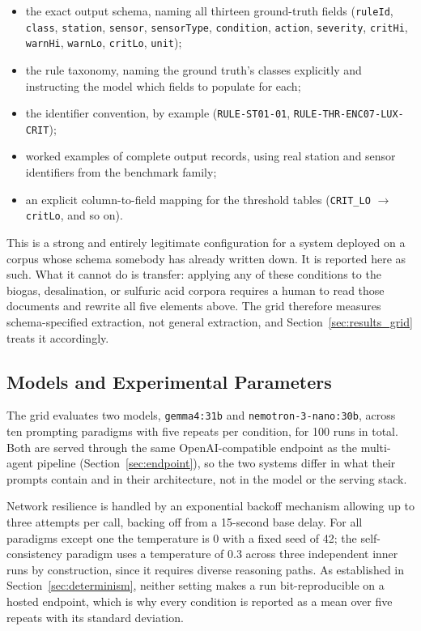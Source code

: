 \documentclass[11pt]{article}
\begin{document}
\begin{itemize}
    \item the exact output schema, naming all thirteen ground-truth fields
          (\texttt{ruleId}, \texttt{class}, \texttt{station}, \texttt{sensor},
          \texttt{sensorType}, \texttt{condition}, \texttt{action},
          \texttt{severity}, \texttt{critHi}, \texttt{warnHi}, \texttt{warnLo},
          \texttt{critLo}, \texttt{unit});
    \item the rule taxonomy, naming the ground truth's classes explicitly and
          instructing the model which fields to populate for each;
    \item the identifier convention, by example
          (\texttt{RULE-ST01-01}, \texttt{RULE-THR-ENC07-LUX-CRIT});
    \item worked examples of complete output records, using real station and
          sensor identifiers from the benchmark family;
    \item an explicit column-to-field mapping for the threshold tables
          (\texttt{CRIT\_LO} $\rightarrow$ \texttt{critLo}, and so on).
\end{itemize}

This is a strong and entirely legitimate configuration for a system deployed on a
corpus whose schema somebody has already written down. It is reported here as
such. What it cannot do is transfer: applying any of these conditions to the
biogas, desalination, or sulfuric acid corpora requires a human to read those
documents and rewrite all five elements above. The grid therefore measures
schema-specified extraction, not general extraction, and Section~\ref{sec:results_grid}
treats it accordingly.

\subsection{Models and Experimental Parameters}
The grid evaluates two models, \texttt{gemma4:31b} and
\texttt{nemotron-3-nano:30b}, across ten prompting paradigms with five repeats
per condition, for 100 runs in total. Both are served through the same
OpenAI-compatible endpoint as the multi-agent pipeline
(Section~\ref{sec:endpoint}), so the two systems differ in what their prompts
contain and in their architecture, not in the model or the serving stack.

Network resilience is handled by an exponential backoff mechanism allowing up to
three attempts per call, backing off from a 15-second base delay. For all paradigms except one the
temperature is $0$ with a fixed seed of 42; the self-consistency paradigm uses
a temperature of $0.3$ across three independent inner runs by construction, since
it requires diverse reasoning paths. As established in
Section~\ref{sec:determinism}, neither setting makes a run bit-reproducible on a
hosted endpoint, which is why every condition is reported as a mean over five
repeats with its standard deviation.
\end{document}
